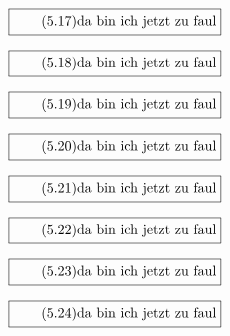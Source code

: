 \documentclass[11pt]{article}
\newcommand{\1}{ {\mathds{1}} }
\begin{document}
		\begin{equation}
			\boxed{
				\tag{5.17}
				\begin{split}
					\text{da bin ich jetzt zu faul}
				\end{split}
			}
		\end{equation}

		\begin{equation}
			\boxed{
				\tag{5.18}
				\begin{split}
					\text{da bin ich jetzt zu faul}
				\end{split}
			}
		\end{equation}

		\begin{equation}
			\boxed{
				\tag{5.19}
				\begin{split}
					\text{da bin ich jetzt zu faul}
				\end{split}
			}
		\end{equation}

		\begin{equation}
			\boxed{
				\tag{5.20}
				\begin{split}
					\text{da bin ich jetzt zu faul}
				\end{split}
			}
		\end{equation}

		\begin{equation}
			\boxed{
				\tag{5.21}
				\begin{split}
					\text{da bin ich jetzt zu faul}
				\end{split}
			}
		\end{equation}

		\begin{equation}
			\boxed{
				\tag{5.22}
				\begin{split}
					\text{da bin ich jetzt zu faul}
				\end{split}
			}
		\end{equation}

		\begin{equation}
			\boxed{
				\tag{5.23}
				\begin{split}
					\text{da bin ich jetzt zu faul}
				\end{split}
			}
		\end{equation}

		\begin{equation}
			\boxed{
				\tag{5.24}
				\begin{split}
					\text{da bin ich jetzt zu faul}
				\end{split}
			}
		\end{equation}
\end{document}
